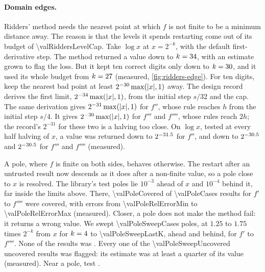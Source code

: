 \paragraph{Domain edges.} Ridders' method needs the nearest point at which $f$ is not finite to be a minimum distance
away. The reason is that the levels it spends restarting come out of its budget of \num{\valRiddersLevelCap}. Take
$\log x$ at $x = 2^{-k}$, with the default first-derivative step. The method returned a value down to
$k = \num{34}$, with an estimate grown to flag the loss. But it kept ten correct digits only
down to $k = \num{30}$, and it used its whole budget from
$k = \num{27}$ (measured, \cref{fig:ridders-edge}). For ten digits, keep the nearest bad point
at least $2^{-\num{30}} \max(\lvert x \rvert, 1)$ away. The design record derives the first
limit, $2^{-34} \max(\lvert x \rvert, 1)$, from the initial step $s/32$ and the cap. The same derivation gives
$2^{-31} \max(\lvert x \rvert, 1)$ for $f''$, whose rule reaches $h$ from the initial step $s/4$. It gives
$2^{-30} \max(\lvert x \rvert, 1)$ for $f'''$ and $f''''$, whose rules reach $2h$; the record's $2^{-31}$ for these two is a
halving too close. On $\log x$, tested at every half halving of $x$, a value was returned down to
$2^{-\num{31.5}}$ for $f''$, and down to
$2^{-\num{30.5}}$ and $2^{-\num{30.5}}$ for $f'''$ and
$f''''$ (measured).

A pole, where $f$ is finite on both sides, behaves otherwise. The restart after an untrusted result now descends as it
does after a non-finite value, so a pole close to $x$ is resolved. The library's test poles lie $10^{-3}$ ahead of $x$
and $10^{-4}$ behind it, far inside the limits above. There, \num{\valPoleCovered} of \num{\valPoleCases} results
for $f'$ to $f''''$ were covered, with errors from \num{\valPoleRelErrorMin} to \num{\valPoleRelErrorMax}
(measured). Closer, a pole does not make the method fail: it returns a wrong value. We swept
\num{\valPoleSweepCases} poles, at $1.25$ to $1.75$ times $2^{-k}$ from $x$ for $k = \num{4}$ to
\num{\valPoleSweepLastK}, ahead and behind, for $f'$ to $f''''$. None of the results was . Every
one of the \num{\valPoleSweepUncovered} uncovered results was flagged: its estimate was at least a quarter of its
value (measured). Near a pole, test .

